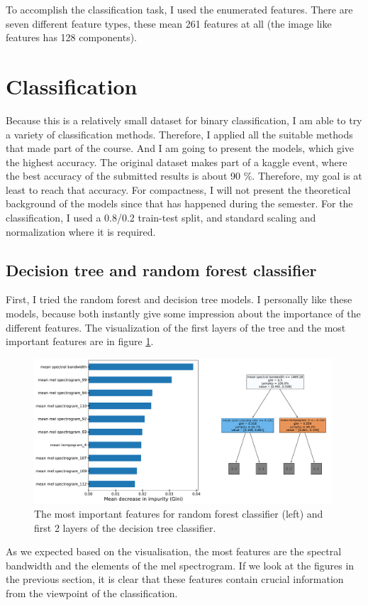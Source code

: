 \documentclass[12pt a4paper]{article}
\numberwithin{equation}{section}
\begin{document}
To accomplish the classification task, I used the enumerated features. There are seven different feature types, these mean 261 features at all (the image like features has 128 components).

\section{Classification}

Because this is a relatively small dataset for binary classification, I am able to try a variety of classification methods. Therefore,  I applied all the suitable methods that made part of the course. And I am going to present the models, which give the highest accuracy. The original dataset makes part of a kaggle event, where the best accuracy of the submitted results is about 90 \%. Therefore, my goal is at least to reach that accuracy. For compactness, I will not present the theoretical background of the models since that has happened during the semester. For the classification, I used a 0.8/0.2 train-test split, and standard scaling and normalization where it is required.

\subsection{Decision tree and random forest classifier}

First, I tried the random forest and decision tree models. I personally like these models, because both instantly give some impression about the importance of the different features. The visualization of the first layers of the tree and the most important features are in figure \ref{fig9}.

\begin{figure}[H]
\centering
\includegraphics[width=0.99\textwidth]{fig/features.pdf}
\caption{The most important features for random forest classifier (left) and first 2 layers of the decision tree classifier.}
\label{fig9}
\end{figure}
As we expected based on the visualisation, the most features are the spectral bandwidth and the elements of the mel spectrogram. If we look at the figures in the previous section, it is clear that these features contain crucial information from the viewpoint of the classification.
\end{document}
